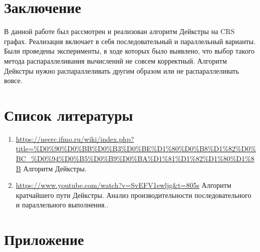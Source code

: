 \documentclass[12pt]{article}
\begin{document}
\newpage
\section*{Заключение}
В данной работе был рассмотрен и реализован алгоритм Дейкстры на CRS графах. Реализация включает в себя  последовательный и параллельный варианты. Были проведены эксперименты, в ходе которых было выявлено, что выбор такого метода распараллеливания вычислений не совсем корректный. Алгоритм Дейкстры нужно распараллеливать другим образом или не распараллеливать вовсе. 

\newpage
\section*{Список литературы}
\begin{enumerate}
    \item \url{https://neerc.ifmo.ru/wiki/index.php?title=%D0%90%D0%BB%D0%B3%D0%BE%D1%80%D0%B8%D1%82%D0%BC_%D0%94%D0%B5%D0%B9%D0%BA%D1%81%D1%82%D1%80%D1%8B}{ Алгоритм Дейкстры}.
    \item \url{https://www.youtube.com/watch?v=SvEFV1ewljg&t=805s}{ Алгоритм кратчайшего пути Дейкстры. Анализ производительности последовательного и параллельного выполнения.}.

\end{enumerate}
\newpage
\section*{Приложение}
\end{document}
